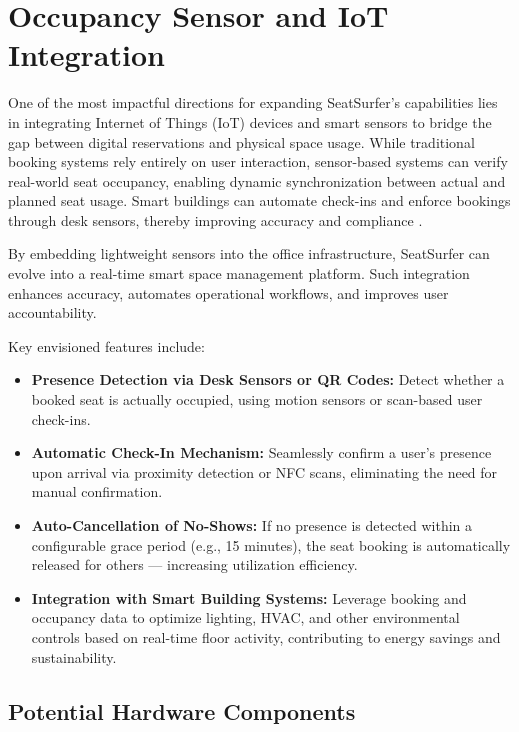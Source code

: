 \documentclass[12pt,a4paper]{report} %
\begin{document}
\section{Occupancy Sensor and IoT Integration}

One of the most impactful directions for expanding SeatSurfer's capabilities lies in integrating Internet of Things (IoT) devices and smart sensors to bridge the gap between digital reservations and physical space usage. While traditional booking systems rely entirely on user interaction, sensor-based systems can verify real-world seat occupancy, enabling dynamic synchronization between actual and planned seat usage. Smart buildings can automate check-ins and enforce bookings through desk sensors, thereby improving accuracy and compliance \cite{liu2021iotdesk}.

By embedding lightweight sensors into the office infrastructure, SeatSurfer can evolve into a real-time smart space management platform. Such integration enhances accuracy, automates operational workflows, and improves user accountability.

Key envisioned features include:

\begin{itemize}
    \item \textbf{Presence Detection via Desk Sensors or QR Codes:}  
    Detect whether a booked seat is actually occupied, using motion sensors or scan-based user check-ins.
    \item \textbf{Automatic Check-In Mechanism:}  
    Seamlessly confirm a user's presence upon arrival via proximity detection or NFC scans, eliminating the need for manual confirmation.
    \item \textbf{Auto-Cancellation of No-Shows:}  
    If no presence is detected within a configurable grace period (e.g., 15 minutes), the seat booking is automatically released for others — increasing utilization efficiency.
    \item \textbf{Integration with Smart Building Systems:}  
    Leverage booking and occupancy data to optimize lighting, HVAC, and other environmental controls based on real-time floor activity, contributing to energy savings and sustainability.
\end{itemize}

\subsection*{Potential Hardware Components}
\end{document}
